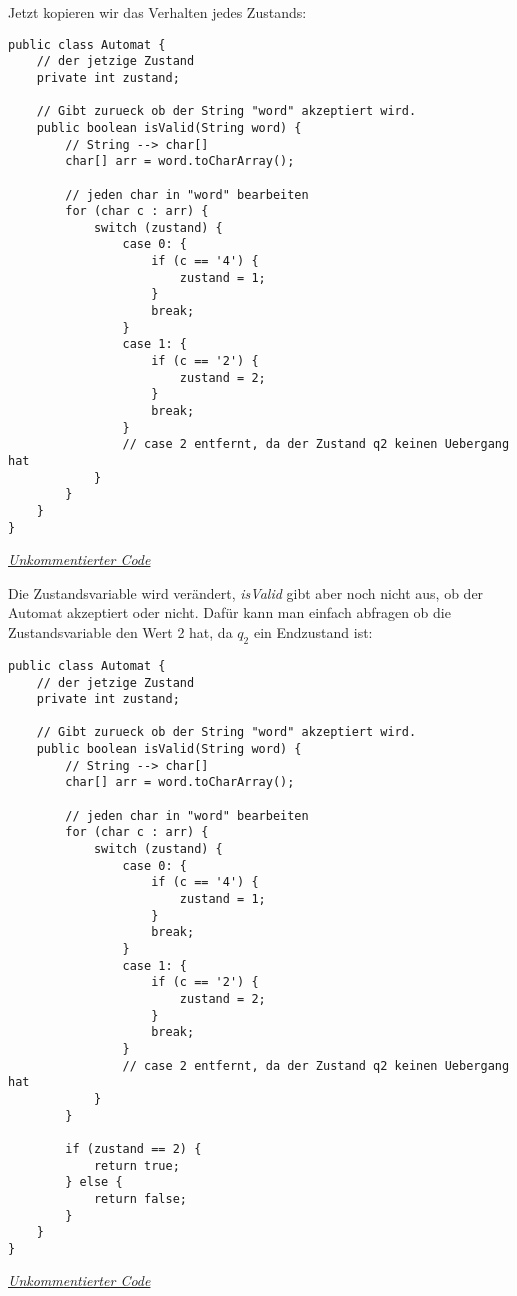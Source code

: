 \begin{flushleft}
Jetzt kopieren wir das Verhalten jedes Zustands:
\end{flushleft}

\begin{center}
\begin{lstlisting}
public class Automat {
    // der jetzige Zustand
    private int zustand;

    // Gibt zurueck ob der String "word" akzeptiert wird.
    public boolean isValid(String word) {
        // String --> char[]
        char[] arr = word.toCharArray();

        // jeden char in "word" bearbeiten
        for (char c : arr) {
            switch (zustand) {
                case 0: {
                    if (c == '4') {
                        zustand = 1;
                    }
                    break;
                }
                case 1: {
                    if (c == '2') {
                        zustand = 2;
                    }
                    break;
                }
                // case 2 entfernt, da der Zustand q2 keinen Uebergang hat
            }
        }
    }
}
\end{lstlisting}
\href{https://raw.githubusercontent.com/tim-tm/articles/refs/heads/main/informatik-notes/code/Automat.java}{\textit{Unkommentierter Code}} \\
\end{center}

\begin{flushleft}
Die Zustandsvariable wird verändert, \textit{isValid}
gibt aber noch nicht aus, ob der Automat akzeptiert oder nicht.
Dafür kann man einfach abfragen ob die Zustandsvariable den Wert 2 hat,
da $q_2$ ein Endzustand ist:
\end{flushleft}

\begin{center}
\begin{lstlisting}
public class Automat {
    // der jetzige Zustand
    private int zustand;

    // Gibt zurueck ob der String "word" akzeptiert wird.
    public boolean isValid(String word) {
        // String --> char[]
        char[] arr = word.toCharArray();

        // jeden char in "word" bearbeiten
        for (char c : arr) {
            switch (zustand) {
                case 0: {
                    if (c == '4') {
                        zustand = 1;
                    }
                    break;
                }
                case 1: {
                    if (c == '2') {
                        zustand = 2;
                    }
                    break;
                }
                // case 2 entfernt, da der Zustand q2 keinen Uebergang hat
            }
        }

        if (zustand == 2) {
            return true;
        } else {
            return false;
        }
    }
}
\end{lstlisting}
\href{https://raw.githubusercontent.com/tim-tm/articles/refs/heads/main/informatik-notes/code/Automat.java}{\textit{Unkommentierter Code}} \\
\end{center}

